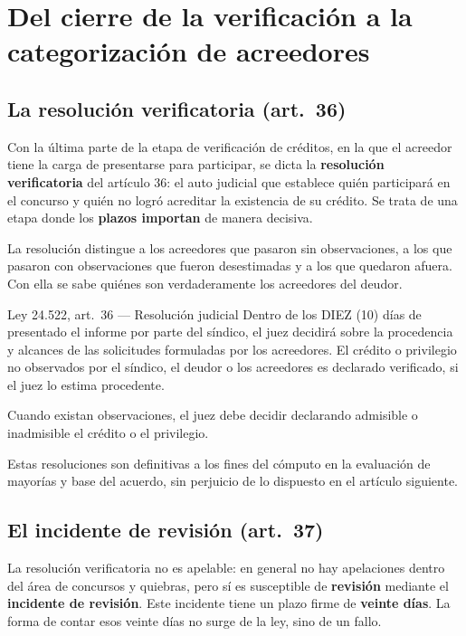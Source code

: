 \documentclass[12pt,oneside]{book}
\begin{document}
\chapter[Verificación y categorización]{Del cierre de la verificación a la categorización de acreedores}

\section{La resolución verificatoria (art.\ 36)}

Con la última parte de la etapa de verificación de créditos, en la que el acreedor tiene la carga de presentarse para participar, se dicta la \textbf{resolución verificatoria} del artículo 36: el auto judicial que establece quién participará en el concurso y quién no logró acreditar la existencia de su crédito. Se trata de una etapa donde los \textbf{plazos importan} de manera decisiva.

La resolución distingue a los acreedores que pasaron sin observaciones, a los que pasaron con observaciones que fueron desestimadas y a los que quedaron afuera. Con ella se sabe quiénes son verdaderamente los acreedores del deudor.

\begin{norma}{Ley 24.522, art.\ 36 --- Resolución judicial}
Dentro de los DIEZ (10) días de presentado el informe por parte del síndico, el juez decidirá sobre la procedencia y alcances de las solicitudes formuladas por los acreedores. El crédito o privilegio no observados por el síndico, el deudor o los acreedores es declarado verificado, si el juez lo estima procedente.

Cuando existan observaciones, el juez debe decidir declarando admisible o inadmisible el crédito o el privilegio.

Estas resoluciones son definitivas a los fines del cómputo en la evaluación de mayorías y base del acuerdo, sin perjuicio de lo dispuesto en el artículo siguiente.
\end{norma}

\section{El incidente de revisión (art.\ 37)}

La resolución verificatoria no es apelable: en general no hay apelaciones dentro del área de concursos y quiebras, pero sí es susceptible de \textbf{revisión} mediante el \textbf{incidente de revisión}. Este incidente tiene un plazo firme de \textbf{veinte días}. La forma de contar esos veinte días no surge de la ley, sino de un fallo.
\end{document}
